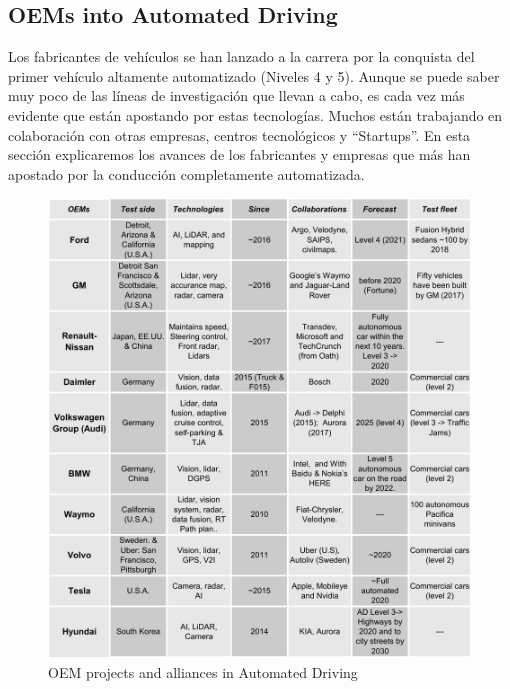 \subsection{OEMs into Automated Driving}
\label{sec:oem-ad}

Los fabricantes de vehículos se han lanzado a la carrera por la conquista del 
primer vehículo altamente automatizado (Niveles 4 y 5). Aunque se puede saber 
muy poco de las líneas de investigación que llevan a cabo, es cada vez más 
evidente que están apostando por estas tecnologías. Muchos están trabajando en 
colaboración con otras empresas, centros tecnológicos y “Startups”. En esta 
sección explicaremos los avances de los fabricantes y empresas que más han 
apostado por la conducción completamente automatizada.

\begin{figure}[p]
    \centering
    \includegraphics[width=1.00\textwidth]{"img/OEM_jp_trim"}
    \caption{OEM projects and alliances in Automated Driving}
    \label{fig:oem-ad}
\end{figure}


